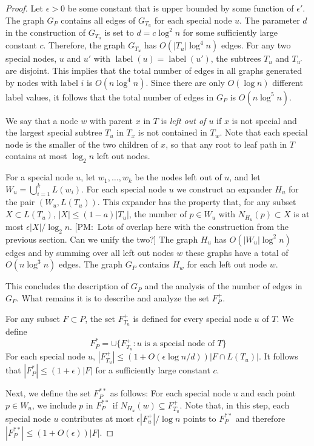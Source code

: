 \documentclass{patmorin}
\newcommand{\note}[2]{{\color{red}[#1:~#2]}}
\DeclareMathOperator{\lbl}{label}
\begin{document}
\begin{proof}
  Let $\epsilon >0$ be some constant that is upper bounded by some
  function of $\epsilon'$.  The graph $G_P$ contains all edges of
  $G_{T_u}$ for each special node $u$.  The parameter $d$ in the
  construction of $G_{T_u}$ is set to $d=c\log^2 n$ for some sufficiently
  large constant $c$.  Therefore, the graph $G_{T_u}$ has $O(|T_u|\log^4
  n)$ edges.  For any two special nodes, $u$ and $u'$ with $\lbl(u)=\lbl(u')$,
  the subtrees $T_u$ and $T_{u'}$ are disjoint.  This implies that the
  total number of edges in all graphs generated by nodes with label
  $i$ is $O(n\log^4 n)$.  Since there are only $O(\log n)$ different
  label values, it follows that the total number of edges in $G_P$
  is $O(n\log^5 n)$.

  We say that a node $w$ with parent $x$ in $T$ is \emph{left out of
  $u$} if $x$ is not special and the largest special subtree $T_u$
  in $T_x$ is not contained in $T_w$.  Note that each special node is
  the smaller of the two children of $x$, so that any root to leaf
  path in $T$ contains at most $\log_2 n$ left out nodes.  
	
  For a special node $u$, let $w_1,\ldots,w_k$ be the nodes left out of $u$, and  let $W_u=\bigcup_{i=1}^k L(w_i)$.  For each special node $u$ we construct
  an expander $H_u$ for the pair
  $(W_u,L(T_u))$. This expander has the property that, for any
  subset $X\subset L(T_u)$, $|X|\le (1-a)|T_u|$, the number of $p\in W_u$
  with $N_{H_u}(p)\subset X$ is at most $\epsilon|X|/\log_2 n$.
  \note{PM}{Lots of overlap here with the construction from the previous
  section. Can we unify the two?}  The graph $H_u$ has $O(|W_u|\log^2
  n)$ edges and by summing over all left out nodes $w$ these graphs have
  a total of $O(n\log^3 n)$ edges.  The graph $G_P$ contains $H_w$
  for each left out node $w$.

  This concludes the description of $G_P$
  and the analysis of the number of edges in $G_P$. What remains it is
  to describe and analyze the set $F^+_P$.

  For any subset $F\subset P$, the set $F^+_{T_u}$ is defined for every
  special node $u$ of $T$.  We define
  \[  F^*_P = \cup\{F^+_{T_u}: \text{$u$ is a special node of $T$}\}
  \]
  For each special node $u$, $|F^+_{T_u}| \le (1+O(\epsilon\log
  n/d))|F\cap L(T_u)|$.  It follows that $|F^*_P| \le (1+\epsilon)|F|$
  for a sufficiently large constant $c$.

  Next, we define the set $F^{**}_P$ as follows: For each special node $u$
  and each point $p\in W_u$, we include $p$ in $F^{**}_P$ if $N_{H_u}(w)
  \subseteq F^+_{T_u}$.  Note that, in this step, each special node $u$
  contributes at most $\epsilon |F^+_u|/\log n$ points to $F^{**}_P$
  and therefore $|F^{**}_P| \le (1+O(\epsilon))|F|$.


\end{proof}
\end{document}
